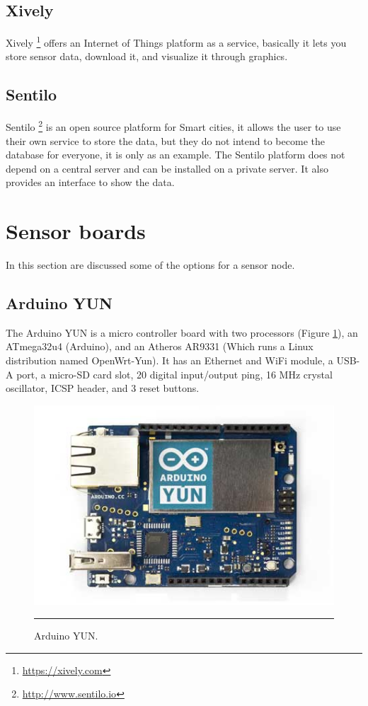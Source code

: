 \documentclass[12pt, a4paper,twoside]{tesi_upf}
\begin{document}
    \subsection{Xively}
      Xively \footnote{\url{https://xively.com}} offers an Internet of Things platform as a service, basically it lets you store sensor data, download it, and visualize it through graphics.
    
    \subsection{Sentilo}
      Sentilo \footnote{\url{http://www.sentilo.io}} is an open source platform for Smart cities, it allows the user to use their own service to store the data, but they do not intend to become the database for everyone, it is only as an example. The Sentilo platform does not depend on a central server and can be installed on a private server. It also provides an interface to show the data.
    
  \section{Sensor boards}
    In this section are discussed some of the options for a sensor node.
    
    \subsection{Arduino YUN}
      The Arduino YUN is a micro controller board with two processors (Figure \ref{fig:AYUN}), an ATmega32u4 (Arduino), and an Atheros AR9331 (Which runs a Linux distribution named OpenWrt-Yun). It has an Ethernet and WiFi module, a USB-A port, a micro-SD card slot, 20 digital input/output ping, 16 MHz crystal oscillator, ICSP header, and 3 reset buttons.
      \begin{figure}[htbp]
        \centering
            \includegraphics[scale=0.4]{./Figures/ArduinoYunFront_2_450px.jpg}
            \\
            \rule{15em}{0.5pt}
        \caption[Arduino YUN]{Arduino YUN.}
        \label{fig:AYUN}
      \end{figure}
      
\end{document}
